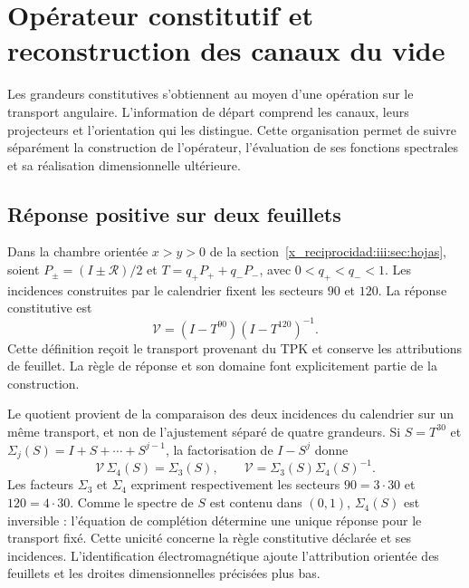 

\chapter{Opérateur constitutif et reconstruction des canaux du vide}
\label{x_reciprocidad:iii:sec:constitutiva}

Les grandeurs constitutives s'obtiennent au moyen d'une opération sur le transport angulaire. L'information de départ comprend les canaux, leurs projecteurs et l'orientation qui les distingue. Cette organisation permet de suivre séparément la construction de l'opérateur, l'évaluation de ses fonctions spectrales et sa réalisation dimensionnelle ultérieure.

\section{Réponse positive sur deux feuillets}

Dans la chambre orientée $x>y>0$ de la section~\ref{x_reciprocidad:iii:sec:hojas}, soient
$P_\pm=(I\pm\mathcal R)/2$ et
$T=q_+P_++q_-P_-$, avec $0<q_+<q_-<1$. Les incidences construites par le
calendrier fixent les secteurs $90$ et $120$. La réponse constitutive est
\begin{equation}
 \mathcal V=(I-T^{90})(I-T^{120})^{-1}.
 \label{x_reciprocidad:iii:eq:vacuum-op}
\end{equation}
Cette définition reçoit le transport provenant du TPK et conserve les
attributions de feuillet. La règle de réponse et son domaine font explicitement partie
de la construction.

Le quotient provient de la comparaison des deux incidences du calendrier sur un même transport, et non de l'ajustement séparé de quatre grandeurs. Si $S=T^{30}$ et $\Sigma_j(S)=I+S+\cdots+S^{j-1}$, la factorisation de $I-S^j$ donne
\begin{equation}
 \mathcal V\,\Sigma_4(S)=\Sigma_3(S),\qquad
 \mathcal V=\Sigma_3(S)\Sigma_4(S)^{-1}.
 \label{x_reciprocidad:iii:eq:completion-response}
\end{equation}
Les facteurs $\Sigma_3$ et $\Sigma_4$ expriment respectivement les
secteurs $90=3\cdot30$ et $120=4\cdot30$. Comme le spectre de $S$ est
contenu dans $(0,1)$, $\Sigma_4(S)$ est inversible : l’équation de
complétion détermine une unique réponse pour le transport fixé.
Cette unicité concerne la règle constitutive déclarée et ses
incidences. L’identification électromagnétique ajoute l’attribution
orientée des feuillets et les droites dimensionnelles précisées plus
bas.

